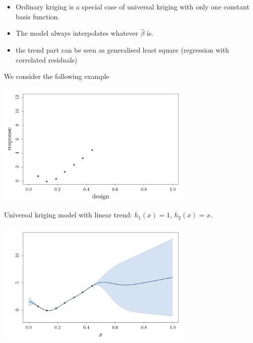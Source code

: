 \documentclass{beamer}
\begin{document}
\begin{frame}{}
\begin{itemize}
	\item Ordinary kriging is a special case of universal kriging with only one constant basis function.
	\item The model always interpolates whatever $\hat{\beta}$ is.
	\item the trend part can be seen as generalised least square (regression with correlated residuals)
\end{itemize}
\end{frame}

\begin{frame}{}
We consider the following example
\begin{center}
	\includegraphics[height=6cm]{figures/R/trend_data}
\end{center}
\end{frame}

\begin{frame}{}
Universal kriging model with linear trend: $h_1(x) = 1$, $h_2(x) = x$.
\begin{center}
	\includegraphics[height=6cm]{figures/R/trend_ku}
\end{center}
\end{frame}
\end{document}
